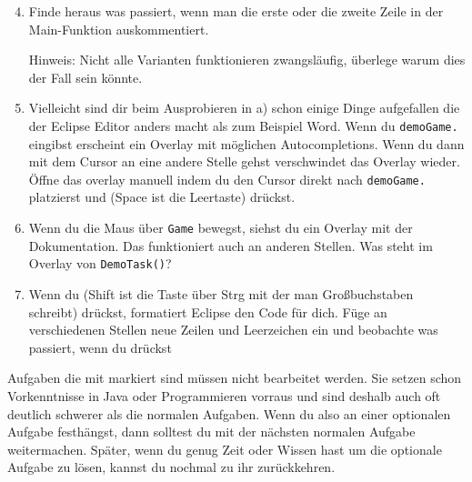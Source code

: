 \begin{enumerate} \setcounter{enumi}{3}
    \item Finde heraus was passiert, wenn man die erste oder die zweite Zeile in der Main-Funktion auskommentiert.

        Hinweis: Nicht alle Varianten funktionieren zwangsläufig, überlege warum dies der Fall sein könnte.
    \item Vielleicht sind dir beim Ausprobieren in a) schon einige Dinge aufgefallen die der Eclipse Editor anders macht als zum Beispiel Word.
        Wenn du \lstinline{demoGame.} eingibst erscheint ein Overlay mit möglichen Autocompletions.
        Wenn du dann mit dem Cursor an eine andere Stelle gehst verschwindet das Overlay wieder.
        Öffne das overlay manuell indem du den Cursor direkt nach \lstinline{demoGame.} platzierst und  (Space ist die Leertaste) drückst.
    \item
        Wenn du die Maus über \lstinline{Game} bewegst, siehst du ein Overlay mit der Dokumentation.
        Das funktioniert auch an anderen Stellen.
        Was steht im Overlay von \lstinline{DemoTask()}?
    \item
        Wenn du  (Shift ist die Taste über Strg mit der man Großbuchstaben schreibt) drückst, formatiert Eclipse den Code für dich.
        Füge an verschiedenen Stellen neue Zeilen und Leerzeichen ein und beobachte was passiert, wenn du  drückst
\end{enumerate}


\begin{Infobox}
    Aufgaben die mit \optional markiert sind müssen nicht bearbeitet werden.
    Sie setzen schon Vorkenntnisse in Java oder Programmieren vorraus und sind deshalb auch oft deutlich schwerer als die normalen Aufgaben.
    Wenn du also an einer optionalen Aufgabe festhängst, dann solltest du mit der nächsten normalen Aufgabe weitermachen.
    Später, wenn du genug Zeit oder Wissen hast um die optionale Aufgabe zu lösen, kannst du nochmal zu ihr zurückkehren.
\end{Infobox}


